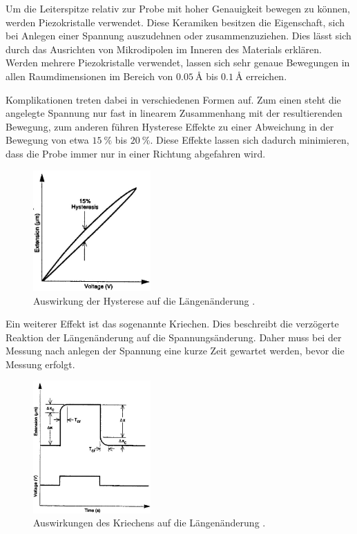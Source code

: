 Um die Leiterspitze relativ zur Probe mit hoher Genauigkeit bewegen zu können, werden Piezokristalle verwendet.
Diese Keramiken besitzen die Eigenschaft, sich bei Anlegen einer Spannung auszudehnen oder zusammenzuziehen.
Dies lässt sich durch das Ausrichten von Mikrodipolen im Inneren des Materials erklären.
Werden mehrere Piezokristalle verwendet, lassen sich sehr genaue Bewegungen in allen Raumdimensionen im Bereich von  $\SI{0,05}{\angstrom}$ bis $\SI{0,1}{\angstrom}$ erreichen.

Komplikationen treten dabei in verschiedenen Formen auf.
Zum einen steht die angelegte Spannung nur fast in linearem Zusammenhang mit der resultierenden Bewegung, zum anderen führen Hysterese Effekte zu einer Abweichung in der Bewegung von etwa $\SI{15}{\percent}$ bis $\SI{20}{\percent}$.
Diese Effekte lassen sich dadurch minimieren, dass die Probe immer nur in einer Richtung abgefahren wird.
\begin{figure}[!h]
    \centering
    \includegraphics[width=0.4\textwidth]{images/hysterese.JPG}
    \caption{Auswirkung der Hysterese auf die Längenänderung \cite{STM-Literatur}.}
\end{figure}

Ein weiterer Effekt ist das sogenannte Kriechen.
Dies beschreibt die verzögerte Reaktion der Längenänderung auf die Spannungsänderung.
Daher muss bei der Messung nach anlegen der Spannung eine kurze Zeit gewartet werden, bevor die Messung erfolgt.
\begin{figure}[!h]
    \centering
    \includegraphics[width=0.4\textwidth]{images/kriechen.JPG}
    \caption{Auswirkungen des Kriechens auf die Längenänderung \cite{STM-Literatur}.}
\end{figure}

